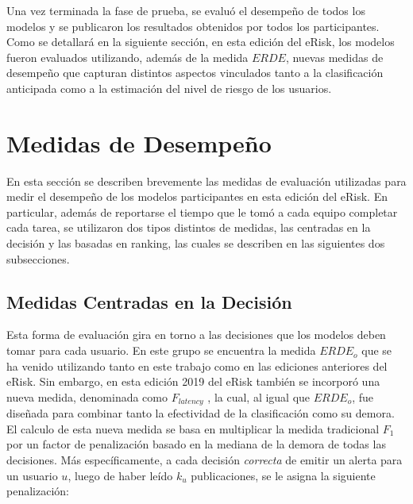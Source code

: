 Una vez terminada la fase de prueba, se evaluó el desempeño de todos los modelos y se publicaron los resultados obtenidos por todos los participantes. Como se detallará en la siguiente sección, en esta edición del eRisk, los modelos fueron evaluados utilizando, además de la medida $ERDE$, nuevas medidas de desempeño que capturan distintos aspectos vinculados tanto a la clasificación anticipada como a la estimación del nivel de riesgo de los usuarios.




\section{Medidas de Desempeño}

En esta sección se describen brevemente las medidas de evaluación utilizadas para medir el desempeño de los modelos participantes en esta edición del eRisk. 
En particular, además de reportarse el tiempo que le tomó a cada equipo completar cada tarea, se utilizaron dos tipos distintos de medidas, las centradas en la decisión y las basadas en ranking, las cuales se describen en las siguientes dos subsecciones.



\subsection{Medidas Centradas en la Decisión}
\label{sec:medidas_decision}

Esta forma de evaluación gira en torno a las decisiones que los modelos deben tomar para cada usuario.
En este grupo se encuentra la medida $ERDE_o$ que se ha venido utilizando tanto en este trabajo como en las ediciones anteriores del eRisk.
Sin embargo, en esta edición 2019 del eRisk también se incorporó una nueva medida, denominada como $F_{latency}$ \cite{sadeque2018measuring}, la cual, al igual que $ERDE_o$, fue diseñada para combinar tanto la efectividad de la clasificación como su demora.
El calculo de esta nueva medida se basa en multiplicar la medida tradicional $F_1$ por un factor de penalización basado en la mediana de la demora de todas las decisiones.
Más específicamente, a cada decisión \emph{correcta} de emitir un alerta para un usuario $u$, luego de haber leído $k_u$ publicaciones, se le asigna la siguiente penalización:

